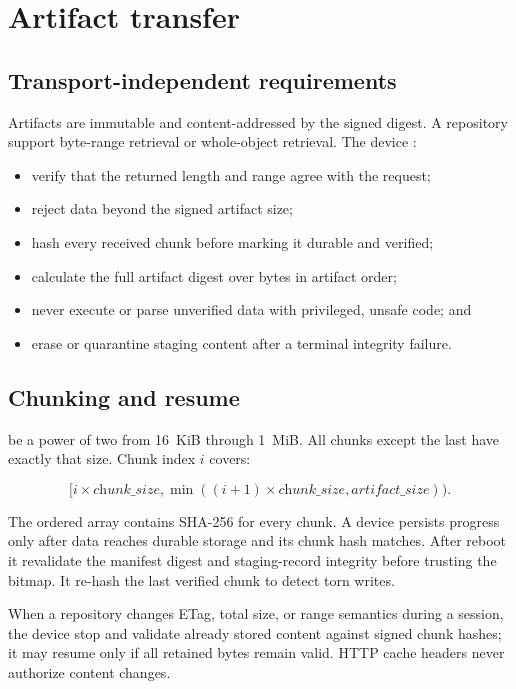 \section{Artifact transfer}

\subsection{Transport-independent requirements}

Artifacts are immutable and content-addressed by the signed digest. A repository
\must support byte-range retrieval or whole-object retrieval. The device \must:

\begin{itemize}
  \item verify that the returned length and range agree with the request;
  \item reject data beyond the signed artifact size;
  \item hash every received chunk before marking it durable and verified;
  \item calculate the full artifact digest over bytes in artifact order;
  \item never execute or parse unverified data with privileged, unsafe code; and
  \item erase or quarantine staging content after a terminal integrity failure.
\end{itemize}

\subsection{Chunking and resume}

 \must be a power of two from 16~KiB through 1~MiB. All chunks
except the last have exactly that size. Chunk index $i$ covers:

\[
  [i \times \textit{chunk\_size},
   \min((i+1) \times \textit{chunk\_size},\textit{artifact\_size})) .
\]

The ordered  array contains SHA-256 for every chunk. A device
persists progress only after data reaches durable storage and its chunk hash
matches. After reboot it \must revalidate the manifest digest and staging-record
integrity before trusting the bitmap. It \should re-hash the last verified chunk
to detect torn writes.

When a repository changes ETag, total size, or range semantics during a session,
the device \must stop and validate already stored content against signed chunk
hashes; it may resume only if all retained bytes remain valid. HTTP cache headers
never authorize content changes.

